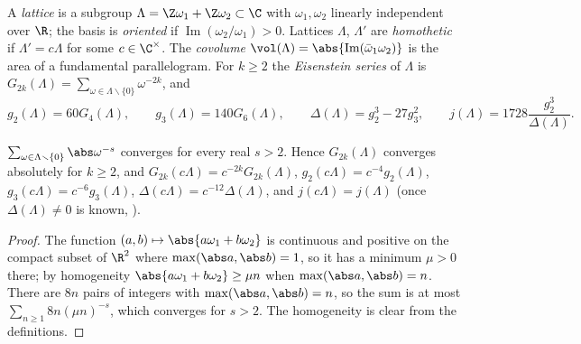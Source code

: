 \begin{definition}[lattices]\label{def:ellcurves:lattice}
A \emph{lattice} is a subgroup $\Lambda=\Z\omega_1+\Z\omega_2\subset\C$ with $\omega_1,\omega_2$ linearly independent over $\R$; the basis is \emph{oriented} if
$\operatorname{Im}(\omega_2/\omega_1)>0$. Lattices $\Lambda$, $\Lambda'$ are \emph{homothetic} if $\Lambda'=c\Lambda$ for some $c\in\C^\times$. The \emph{covolume} $\vol(\Lambda)=\abs{\operatorname{Im}(\bar\omega_1\omega_2)}$ is
the area of a fundamental parallelogram. For $k\ge2$ the \emph{Eisenstein series} of $\Lambda$ is $G_{2k}(\Lambda)=\sum_{\omega\in\Lambda\smallsetminus\{0\}}\omega^{-2k}$, and
\[
g_2(\Lambda)=60G_4(\Lambda),\qquad g_3(\Lambda)=140G_6(\Lambda),\qquad\Delta(\Lambda)=g_2^3-27g_3^2,\qquad j(\Lambda)=1728\frac{g_2^3}{\Delta(\Lambda)} .
\]
\end{definition}

\begin{lemma}\label{lem:ellcurves:latticesum}
$\sum_{\omega\in\Lambda\smallsetminus\{0\}}\abs\omega^{-s}$ converges for every real $s>2$. Hence $G_{2k}(\Lambda)$ converges absolutely for $k\ge2$, and
$G_{2k}(c\Lambda)=c^{-2k}G_{2k}(\Lambda)$, $g_2(c\Lambda)=c^{-4}g_2(\Lambda)$, $g_3(c\Lambda)=c^{-6}g_3(\Lambda)$, $\Delta(c\Lambda)=c^{-12}\Delta(\Lambda)$, and $j(c\Lambda)=j(\Lambda)$ (once
$\Delta(\Lambda)\ne0$ is known, ).
\end{lemma}

\begin{proof}
The function $(a,b)\mapsto\abs{a\omega_1+b\omega_2}$ is continuous and positive on the compact subset of $\R^2$ where $\max(\abs a,\abs b)=1$, so it has a minimum $\mu>0$ there; by
homogeneity $\abs{a\omega_1+b\omega_2}\ge\mu n$ when $\max(\abs a,\abs b)=n$. There are $8n$ pairs of integers with $\max(\abs a,\abs b)=n$, so the sum is at most
$\sum_{n\ge1}8n(\mu n)^{-s}$, which converges for $s>2$. The homogeneity is clear from the definitions.
\end{proof}


